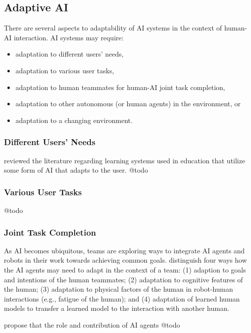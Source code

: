 \subsection{Adaptive AI}

There are several aspects to adaptability of AI systems in the context of human-AI interaction. AI systems may
require:
\begin{itemize}
    \item adaptation to different users' needs,
    \item adaptation to various user tasks,
    \item adaptation to human teammates for human-AI joint task completion,
    \item adaptation to other autonomous (or human agents) in the environment, or
    \item adaptation to a changing environment.
\end{itemize}

\subsubsection{Different Users' Needs}

\cite{kabudiAIenabledAdaptiveLearning2021} reviewed the literature regarding learning systems used in education
that utilize some form of AI that adapts to the user. 
{\color{purple} @todo}


\subsubsection{Various User Tasks}
{\color{purple} @todo}


\subsubsection{Joint Task Completion}

As AI becomes ubiquitous, teams are exploring ways to integrate AI agents and robots in their work towards
achieving common goals. \cite{zhaoRoleAdaptationCollective2022} distinguish four ways how the AI agents may need
to adapt in the context of a team: (1) adaption to goals and intentions of the human teammates; (2) adaptation
to cognitive features of the human; (3) adaptation to physical factors of the human in robot-human interactions
(e.g., fatigue of the human); and (4) adaptation of learned human models to transfer a learned model to the
interaction with another human.

\cite{hauptmanAdaptOvercomePerceptions2023} propose that the role and contribution of AI agents 
{\color{purple} @todo}


